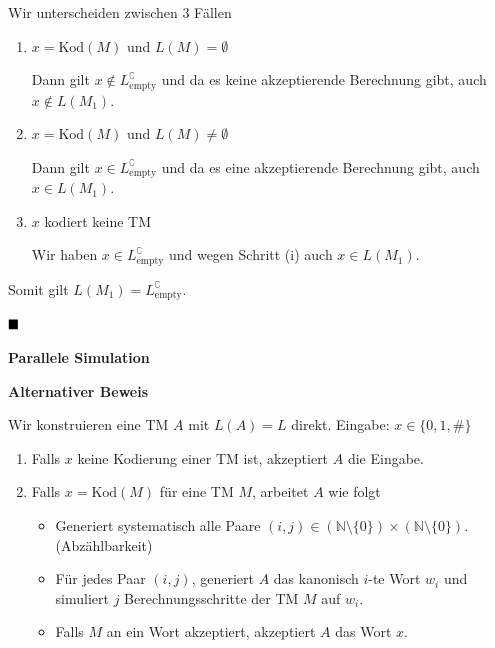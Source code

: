 \documentclass[a4paper, 11pt]{article}
\def\N{\mathbb{N}}
\newcommand\myTitle[1]{{\large \textbf {#1}}}
\begin{document}
                
                    Wir unterscheiden zwischen 3 Fällen
                    \begin{enumerate}[label = \Roman*]
                        
                        \item $x = \text{Kod}(M)$ und $L(M) = \emptyset$
                        
                        Dann gilt $x \notin L_{\text{empty}}^\complement$ und da es keine akzeptierende Berechnung gibt, auch $x \notin L(M_1)$.
                        
                        \item $x = \text{Kod}(M)$ und $L(M) \neq \emptyset$
                        
                        Dann gilt $x \in L_{\text{empty}}^\complement$ und da es eine akzeptierende Berechnung gibt, auch $x \in L(M_1)$.
                        
                        \item $x$ kodiert keine TM
                        
                        Wir haben $x \in L_{\text{empty}}^\complement$ und wegen Schritt (i) auch $x \in L(M_1)$.
                    \end{enumerate}
                    Somit gilt $L(M_1) = L_{\text{empty}}^\complement$.
                
                    $\hfill\blacksquare$
                
                
                
                    \myTitle{Parallele Simulation}

                    \textbf{Alternativer Beweis}
                
                    Wir konstruieren eine TM $A$ mit $L(A) = L$ direkt.
                    Eingabe: $x \in \{0,1,\#\}$
                    \begin{enumerate}[label=\Roman*.]
                        
                        \item Falls $x$ keine Kodierung einer TM ist, akzeptiert $A$ die Eingabe.
                        
                        \item Falls $x = \text{Kod}(M)$ für eine TM $M$, arbeitet $A$ wie folgt
                        \begin{itemize}[label=-]
                            \item Generiert systematisch alle Paare $(i, j) \in (\N \setminus \{0\}) \times (\N \setminus \{0\})$. (Abzählbarkeit)
                            \item Für jedes Paar $(i, j)$, generiert $A$ das kanonisch $i$-te Wort $w_i$ und simuliert $j$ Berechnungsschritte der TM $M$ auf $w_i$.
                            \item Falls $M$ an ein Wort akzeptiert, akzeptiert $A$ das Wort $x$.
                        \end{itemize}
                    \end{enumerate}
                
\end{document}
